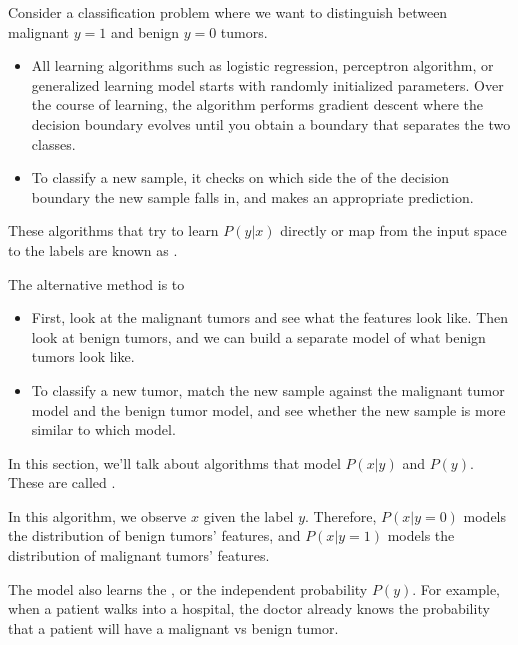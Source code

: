 \documentclass[12pt]{scrartcl}
\begin{document}
Consider a classification problem where we want to distinguish between
malignant $y=1$ and benign $y=0$ tumors.
\begin{itemize}
    \item All learning algorithms such as logistic regression, perceptron algorithm, or
          generalized learning model starts with randomly initialized parameters. Over
          the course of learning, the algorithm performs gradient descent where the
          decision boundary evolves until you obtain a boundary that separates the two
          classes.
    \item To classify a new sample, it checks on which side the of the decision boundary
          the new sample falls in, and makes an appropriate prediction.
\end{itemize}
\begin{definition}
    These algorithms that try to learn $P(y | x)$ directly or map from the input space to the labels are known as .
\end{definition}
The alternative method is to
\begin{itemize}
    \item First, look at the malignant tumors and see what the features look like. Then
          look at benign tumors, and we can build a separate model of what benign tumors
          look like.
    \item To classify a new tumor, match the new sample against the malignant tumor model
          and the benign tumor model, and see whether the new sample is more similar to
          which model.
\end{itemize}
\begin{definition}
    In this section, we'll talk about algorithms that model $P(x | y)$ and $P(y)$. These are called .
\end{definition}
\begin{note}
    In this algorithm, we observe $x$ given the label $y$. Therefore, $P(x | y=0)$ models the distribution of benign tumors' features, and $P(x | y = 1)$ models the distribution of malignant tumors' features.
\end{note}
\begin{definition}
    The model also learns the , or the independent probability $P(y)$. For example, when a patient walks into a hospital, the doctor already knows the probability that a patient will have a malignant vs benign tumor.
\end{definition}
\end{document}
